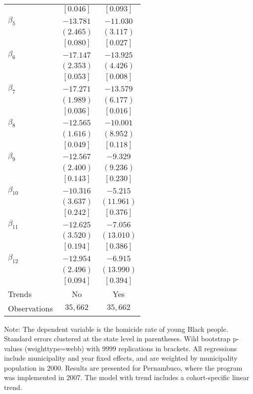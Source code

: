 \documentclass[12pt]{article}
\begin{document}
\begin{table}[H]
\begin{tabular}{lcc}
& $[  0.046]$ & $[  0.093]$ \\
$\beta_{5}$ & $-13.781$ & $-11.030$ \\
& $(  2.465)$ & $(  3.117)$ \\
& $[  0.080]$ & $[  0.027]$ \\
$\beta_{6}$ & $-17.147$ & $-13.925$ \\
& $(  2.353)$ & $(  4.426)$ \\
& $[  0.053]$ & $[  0.008]$ \\
$\beta_{7}$ & $-17.271$ & $-13.579$ \\
& $(  1.989)$ & $(  6.177)$ \\
& $[  0.036]$ & $[  0.016]$ \\
$\beta_{8}$ & $-12.565$ & $-10.001$ \\
& $(  1.616)$ & $(  8.952)$ \\
& $[  0.049]$ & $[  0.118]$ \\
$\beta_{9}$ & $-12.567$ & $ -9.329$ \\
& $(  2.400)$ & $(  9.236)$ \\
& $[  0.143]$ & $[  0.230]$ \\
$\beta_{10}$ & $-10.316$ & $ -5.215$ \\
& $(  3.637)$ & $( 11.961)$ \\
& $[  0.242]$ & $[  0.376]$ \\
$\beta_{11}$ & $-12.625$ & $ -7.056$ \\
& $(  3.520)$ & $( 13.010)$ \\
& $[  0.194]$ & $[  0.386]$ \\
$\beta_{12}$ & $-12.954$ & $ -6.915$ \\
& $(  2.496)$ & $( 13.990)$ \\
& $[  0.094]$ & $[  0.394]$ \\
\midrule
Trends & No & Yes \\
Observations & $   35,662$ & $   35,662$ \\
\bottomrule
\end{tabular}
\begin{threeparttable}
\begin{tablenotes}
\small
\item Note: The dependent variable is the homicide rate of young Black people. 
Standard errors clustered at the state level in parentheses. 
Wild bootstrap p-values (weighttype=webb) with 9999 replications in brackets. 
All regressions include municipality and year fixed effects, and are weighted by municipality population in 2000. 
Results are presented for Pernambuco, where the program was implemented in 2007. 
The model with trend includes a cohort-specific linear trend. 
\end{tablenotes}
\end{threeparttable}
\end{table}
\end{document}
